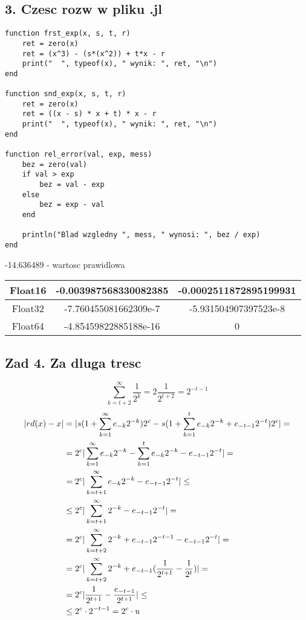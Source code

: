 \documentclass{article}[13pt]
\begin{document}
    \subsection*{3. Czesc rozw w pliku .jl}

\begin{lstlisting}[language=juleczka]
function frst_exp(x, s, t, r)
    ret = zero(x)
    ret = (x^3) - (s*(x^2)) + t*x - r
    print("  ", typeof(x), " wynik: ", ret, "\n")
end

function snd_exp(x, s, t, r)
    ret = zero(x)
    ret = ((x - s) * x + t) * x - r
    print("  ", typeof(x), " wynik: ", ret, "\n")
end

function rel_error(val, exp, mess)
    bez = zero(val)
    if val > exp
        bez = val - exp
    else
        bez = exp - val
    end

    println("Blad wzgledny ", mess, " wynosi: ", bez / exp)
end
\end{lstlisting}

    -14.636489 - wartosc prawidlowa

    {\renewcommand{\arraystretch}{2}
    \begin{tabular}{| c | c | c |}
        \hline

        Float16 & -0.003987568330082385 & -0.0002511872895199931 \\

        \hline

        Float32 & -7.760455081662309e-7 & -5.931504907397523e-8 \\

        \hline

        Float64 & -4.85459822885188e-16 & 0 \\

        \hline
    \end{tabular}}

    \subsection*{Zad 4. Za dluga tresc}

    $$\sum\limits_{k=t+2}^\infty \frac1{2^k} = 2\frac1{2^{t+2}} = 2^{-t-1}$$
    \begin{align*}
        |rd(x)-x|&=|s(1+\sum\limits_{k=1}^\infty e_{-k}2^{-k})2^c-s(1+\sum\limits_{k=1}^t e_{-k}2^{-k} + e_{-t-1}2^{-t})2^c|=\\
        &=2^c|\sum\limits_{k=1}^\infty e_{-k}2^{-k} - \sum\limits_{k=1}^t e_{-k}2^{-k} - e_{-t-1}2^{-t}| =\\
        &= 2^c|\sum\limits_{k=t+1}^\infty e_{-k}2^{-k} - e_{-t-1}2^{-t}| \leq\\
        &\leq 2^c|\sum\limits_{k=t+1}^\infty2^{-k} - e_{-t-1}2^{-t}|=\\
        &= 2^c|\sum\limits_{k=t+2}^\infty2^{-k}+e_{-t-1}2^{-t-1} - e_{-t-1}2^{-t}|=\\
        &= 2^c|\sum\limits_{k=t+2}^\infty2^{-k}+e_{-t-1}({1\over 2^{t+1}} - {1\over 2^t})| =\\
        &= 2^c|\frac1{2^{t+1}}-{e_{-t-1}\over 2^{t+1}}| \leq\\
        &\leq 2^c\cdot 2^{-t-1}=2^c\cdot u
    \end{align*}
\end{document}
